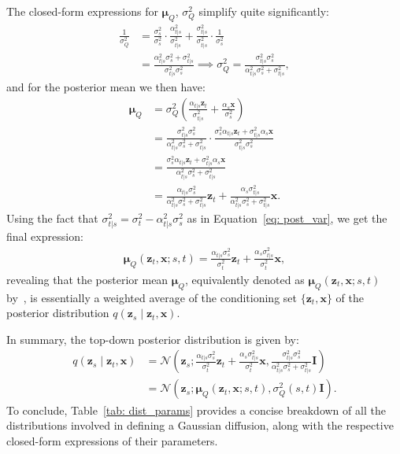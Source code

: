 The closed-form expressions for $\boldsymbol{\mu}_Q$, $\sigma^2_Q$ simplify quite significantly:
\begin{align}
    \frac{1}{\sigma^2_Q} &= \frac{\sigma^2_s}{\sigma^2_s}\cdot
    \frac{\alpha_{t|s}^2}{\sigma_{t|s}^2} + \frac{\sigma^2_{t|s}}{\sigma^2_{t|s}} \cdot \frac{1}{\sigma_s^2} \\[5pt] & = \frac{\alpha_{t|s}^2 \sigma_s^2 + \sigma_{t|s}^2}{\sigma_{t|s}^2\sigma_s^2} \implies \sigma_Q^2 = \frac{\sigma_{t|s}^2\sigma_s^2}{\alpha_{t|s}^2 \sigma_s^2 + \sigma_{t|s}^2},
\end{align}
%
and for the posterior mean we then have:
\begin{align}
    \boldsymbol{\mu}_Q & = 
    {\sigma^2_Q} \left(\frac{\alpha_{t|s}\mathbf{z}_t}{\sigma_{t|s}^2} + \frac{\alpha_s\mathbf{x}}{\sigma_s^2}\right)
    \\[5pt] &= \frac{\sigma_{t|s}^2\sigma_s^2}{\alpha_{t|s}^2 \sigma_s^2 + \sigma_{t|s}^2} \cdot \frac{\sigma_s^2\alpha_{t|s}\mathbf{z}_t + \sigma_{t|s}^2\alpha_s\mathbf{x}}{\sigma_{t|s}^2\sigma_s^2} 
    \\[5pt] &
    = \frac{\sigma_s^2\alpha_{t|s}\mathbf{z}_t + \sigma_{t|s}^2\alpha_s\mathbf{x}}{\alpha_{t|s}^2 \sigma_s^2 + \sigma_{t|s}^2}
    \\[5pt] &= \frac{\alpha_{t|s}\sigma_s^2}{\alpha_{t|s}^2 \sigma_s^2 + \sigma_{t|s}^2}\mathbf{z}_t + \frac{\alpha_s \sigma^2_{t|s}}{\alpha_{t|s}^2 \sigma_s^2 + \sigma_{t|s}^2}\mathbf{x}.
\end{align}
%
Using the fact that $\sigma_{t|s}^2 = \sigma^2_t - \alpha_{t|s}^2 \sigma_s^2$ as in Equation~\ref{eq: post_var}, we get the final expression:
%
\begin{align}
    \boldsymbol{\mu}_Q(\mathbf{z}_t, \mathbf{x};s,t) = \frac{\alpha_{t|s}\sigma_s^2}{\sigma^2_{t}}\mathbf{z}_t + \frac{\alpha_s \sigma^2_{t|s}}{\sigma_{t}^2}\mathbf{x}, \label{eq: post_mu}
\end{align}
%
revealing that the posterior mean $\boldsymbol{\mu}_Q$, equivalently denoted as $\boldsymbol{\mu}_Q(\mathbf{z}_t, \mathbf{x};s,t)$ by~\cite{kingma2021variational}, is essentially a weighted average of the conditioning set $\{\mathbf{z}_t, \mathbf{x}\}$ of the posterior distribution $q(\mathbf{z}_s \mid \mathbf{z}_t, \mathbf{x})$.

In summary, the top-down posterior distribution is given by:
%
\begin{align}
    q(\mathbf{z}_s \mid \mathbf{z}_{t}, \mathbf{x}) & = \mathcal{N} \left(\mathbf{z}_s;\frac{\alpha_{t|s}\sigma_s^2}{\sigma^2_{t}}\mathbf{z}_t + \frac{\alpha_s \sigma^2_{t|s}}{\sigma_{t}^2}\mathbf{x}, \frac{\sigma_{t|s}^2\sigma_s^2}{\alpha_{t|s}^2 \sigma_s^2 + \sigma_{t|s}^2} \mathbf{I}\right)
    \\[5pt] & = \mathcal{N} \left(\mathbf{z}_s;\boldsymbol{\mu}_Q(\mathbf{z}_t, \mathbf{x}; s, t), \sigma^2_Q(s,t) \mathbf{I}\right).
\end{align}
%
To conclude, Table~\ref{tab: dist_params} provides a concise breakdown of all the distributions involved in defining a Gaussian diffusion, along with the respective closed-form expressions of their parameters.

